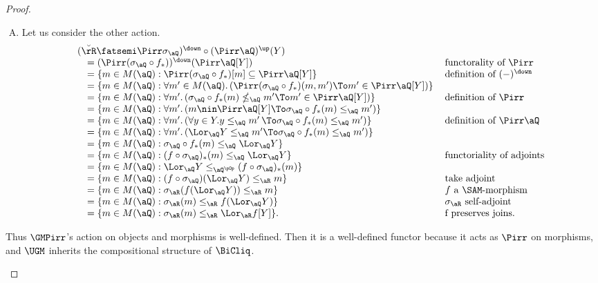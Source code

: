 \documentclass{article}
\begin{document}
\begin{proof}
\begin{enumerate}
\begin{enumerate}[(A)]
\item
Let us consider the other action.
\[
\begin{tabular}{lll}
$(\breve{\rR} \fatsemi \Pirr\sigma_\aQ)^\down \circ (\Pirr\aQ)^\up(Y)$
\\ \quad
$= (\Pirr (\sigma_\aQ \circ f_*))^\down(\Pirr\aQ[Y])$
& functorality of $\Pirr$
\\ \quad
$= \{ m \in M(\aQ) : \Pirr(\sigma_\aQ \circ f_*)[m] \subseteq \Pirr\aQ[Y] \}$
& definition of $(-)^\down$
\\ \quad
$= \{ m \in M(\aQ) : \forall m' \in M(\aQ).\,( \Pirr(\sigma_\aQ \circ f_*)(m,m') \To m' \in \Pirr\aQ[Y]  ) \}$
\\ \quad
$= \{ m \in M(\aQ) : \forall m'.\,(\sigma_\aQ \circ f_*(m) \nleq_\aQ m' \To m' \in \Pirr\aQ[Y]) \}$
& definition of $\Pirr$
\\ \quad
$= \{ m \in M(\aQ) : \forall m'.\,(m \nin \Pirr\aQ[Y] \To \sigma_\aQ \circ f_*(m) \leq_\aQ m' ) \}$
\\ \quad
$= \{ m \in M(\aQ) : \forall m'.\,(\forall y \in Y.y \leq_\aQ m' \, \To  \sigma_\aQ \circ f_*(m) \leq_\aQ m') \}$
& definition of $\Pirr\aQ$
\\ \quad
$= \{ m \in M(\aQ) : \forall m'.\,(\Lor_\aQ Y \leq_\aQ m' \To  \sigma_\aQ \circ f_*(m) \leq_\aQ m') \}$
\\ \quad
$= \{ m \in M(\aQ) :  \sigma_\aQ \circ f_*(m) \leq_\aQ \Lor_\aQ Y \}$
\\ \quad
$= \{ m \in M(\aQ) :  (f \circ \sigma_\aQ)_*(m) \leq_\aQ \Lor_\aQ Y \}$
& functoriality of adjoints
\\ \quad
$= \{ m \in M(\aQ) :  \Lor_\aQ Y \leq_{\aQ^{\pOp}} (f \circ \sigma_\aQ)_*(m) \}$
& 
\\ \quad
$= \{ m \in M(\aQ) :  (f \circ \sigma_\aQ)(\Lor_\aQ Y ) \leq_\aR m \}$
& take adjoint
\\ \quad
$= \{ m \in M(\aQ) :  \sigma_\aR (f(\Lor_\aQ Y )) \leq_\aR m \}$
& $f$ a $\SAM$-morphism
\\ \quad
$= \{ m \in M(\aQ) :  \sigma_\aR (m) \leq_\aR f(\Lor_\aQ Y ) \}$
& $\sigma_\aR$ self-adjoint
\\ \quad
$= \{ m \in M(\aQ) :  \sigma_\aR (m) \leq_\aR \Lor_\aR f[Y] \}$.
& f preserves joins.
\end{tabular}
\]
\end{enumerate}

Thus $\GMPirr$'s action on objects and morphisms is well-defined. Then it is a well-defined functor because it acts as $\Pirr$ on morphisms, and $\UGM$ inherits the compositional structure of $\BiCliq$.



\end{enumerate}
\end{proof}
\end{document}
